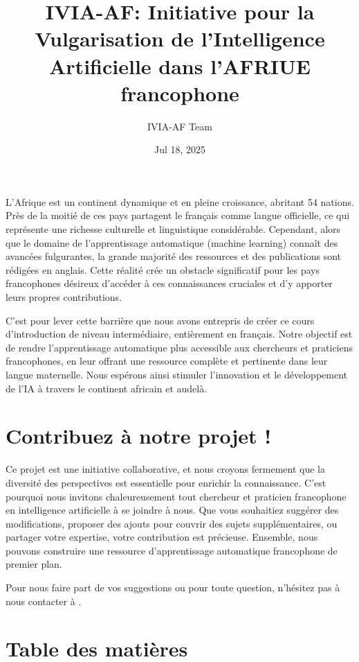 \documentclass[letterpaper,11pt,english]{sphinxmanual}
\title{IVIA-AF: Initiative pour la Vulgarisation de l’Intelligence Artificielle dans l’AFRIUE francophone}
\date{Jul 18, 2025}
\author{IVIA-AF Team}
\begin{document}
\pagestyle{empty}
\sphinxmaketitle
\pagestyle{plain}
\sphinxtableofcontents
\pagestyle{normal}
\label{\detokenize{index::doc}}


\sphinxAtStartPar
L’Afrique est un continent dynamique et en pleine croissance, abritant
54 nations. Près de la moitié de ces pays partagent le français comme
langue officielle, ce qui représente une richesse culturelle et
linguistique considérable. Cependant, alors que le domaine de
l’apprentissage automatique (machine learning) connaît des avancées
fulgurantes, la grande majorité des ressources et des publications sont
rédigées en anglais. Cette réalité crée un obstacle significatif pour
les pays francophones désireux d’accéder à ces connaissances cruciales
et d’y apporter leurs propres contributions.

\sphinxAtStartPar
C’est pour lever cette barrière que nous avons entrepris de créer ce
cours d’introduction de niveau intermédiaire, entièrement en français.
Notre objectif est de rendre l’apprentissage automatique plus accessible
aux chercheurs et praticiens francophones, en leur offrant une ressource
complète et pertinente dans leur langue maternelle. Nous espérons ainsi
stimuler l’innovation et le développement de l’IA à travers le continent
africain et au\sphinxhyphen{}delà.


\chapter{Contribuez à notre projet !}
\label{\detokenize{index:contribuez-a-notre-projet}}
\sphinxAtStartPar
Ce projet  est une initiative
collaborative, et nous croyons fermement que la diversité des
perspectives est essentielle pour enrichir la connaissance. C’est
pourquoi nous invitons chaleureusement tout chercheur et praticien
francophone en intelligence artificielle à se joindre à nous. Que vous
souhaitiez suggérer des modifications, proposer des ajouts pour couvrir
des sujets supplémentaires, ou partager votre expertise, votre
contribution est précieuse. Ensemble, nous pouvons construire une
ressource d’apprentissage automatique francophone de premier plan.

\sphinxAtStartPar
Pour nous faire part de vos suggestions ou pour toute question,
n’hésitez pas à nous contacter à .


\chapter{Table des matières}
\label{\detokenize{index:table-des-matieres}}
\sphinxstepscope
\end{document}
